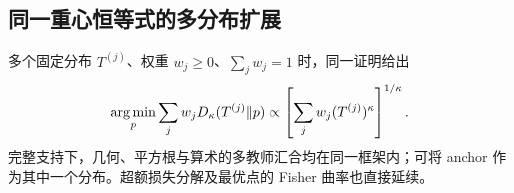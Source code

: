 \subsection{同一重心恒等式的多分布扩展}

多个固定分布 $T^{(j)}$、权重 $w_j\ge0$、$\sum_jw_j=1$ 时，同一证明给出
\begin{equation}
 \operatorname*{arg\,min}_p\sum_jw_jD_\kappa(T^{(j)}\Vert p)
 \propto\left[\sum_jw_j(T^{(j)})^\kappa\right]^{1/\kappa}.
\end{equation}
完整支持下，几何、平方根与算术的多教师汇合均在同一框架内；可将 anchor 作为其中一个分布。超额损失分解及最优点的 Fisher 曲率也直接延续。

